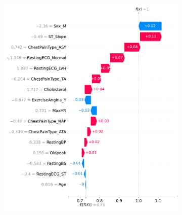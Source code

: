 \begin{figure}
\begin{subfigure}{1\columnwidth}
        \caption{}
    \end{subfigure}
    \begin{subfigure}{1\columnwidth}
        \includegraphics[width=1\textwidth]{images/shap_sample_negative_3.pdf}
        \caption{}
        \label{fig:shap_sample_negative_3}
    \end{subfigure}
    \begin{subfigure}{1\columnwidth}

\end{subfigure}
\end{figure}
